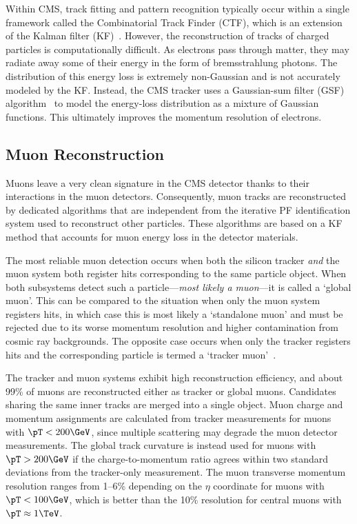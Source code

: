 Within CMS, track fitting and pattern recognition typically occur within a single framework called the Combinatorial Track Finder (CTF), which is an extension of the Kalman filter (KF)~\cite{general_track_reco}.
However, the reconstruction of tracks of charged particles is computationally difficult.
As electrons pass through matter, they may radiate away some of their energy in the form of bremsstrahlung photons.
The distribution of this energy loss is extremely non-Gaussian and is not accurately modeled by the KF.
Instead, the CMS tracker uses a Gaussian-sum filter (GSF) algorithm~\cite{gsf} to model the energy-loss distribution as a mixture of Gaussian functions.
This ultimately improves the momentum resolution of electrons.

\subsection{Muon Reconstruction}
\label{sec:muon_reco}
Muons leave a very clean signature in the CMS detector thanks to their interactions in the muon detectors.
Consequently, muon tracks are reconstructed by dedicated algorithms that are independent from the iterative PF identification system used to reconstruct other particles.
These algorithms are based on a KF method that accounts for muon energy loss in the detector materials.

The most reliable muon detection occurs when both the silicon tracker \emph{and} the muon system both register hits corresponding to the same particle object.
When both subsystems detect such a particle---\emph{most likely a muon}---it is called a `global muon'.
This can be compared to the situation when only the muon system registers hits, in which case this is most likely a `standalone muon' and must be rejected due to its worse momentum resolution and higher contamination from cosmic ray backgrounds.
The opposite case occurs when only the tracker registers hits and the corresponding particle is termed a `tracker muon'~\cite{reco_muon}.

The tracker and muon systems exhibit high reconstruction efficiency, and about 99\% of muons are reconstructed either as tracker or global muons.
Candidates sharing the same inner tracks are merged into a single object.
Muon charge and momentum assignments are calculated from tracker measurements for muons with $\pT < 200\GeV$, since multiple scattering may degrade the muon detector measurements.
The global track curvature is instead used for muons with $\pT > 200\GeV$ if the charge-to-momentum ratio agrees within two standard deviations from the tracker-only measurement.
The muon transverse momentum resolution ranges from 1--6\% depending on the $\eta$ coordinate for muons with $\pT < 100\GeV$, which is better than the 10\% resolution for central muons with $\pT \approx 1\TeV$.

